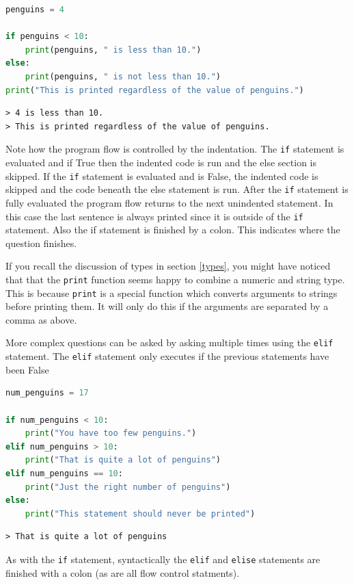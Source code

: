 		\begin{lstlisting}[language=Python]
penguins = 4

if penguins < 10:
	print(penguins, " is less than 10.")
else:
	print(penguins, " is not less than 10.")
print("This is printed regardless of the value of penguins.")\end{lstlisting}
		\begin{verbatim}
> 4 is less than 10.
> This is printed regardless of the value of penguins.\end{verbatim}	
		Note how the program flow is controlled by the indentation. The \texttt{if} statement  is evaluated and if True then the indented code is run and the else section is skipped. If the \texttt{if} statement  is evaluated and is False, the indented code is skipped and the code beneath the else statement is run. After the \texttt{if}  statement is fully evaluated the program flow returns to the next unindented statement. In this case the last sentence is always printed since it is outside of the \texttt{if} statement. Also the if statement is finished by a colon. This indicates where the question finishes.
		
		If you recall the discussion of types in section \ref{types}, you might have noticed that that the \texttt{print} function seems happy to combine a numeric and string type. This is because \texttt{print} is a special function which converts arguments to strings before printing them. It will only do this if the arguments are separated by a comma as above.
		
		More complex questions can be asked by asking multiple times using the \texttt{elif} statement. The \texttt{elif} statement only executes if the previous statements have been False
		\begin{lstlisting}[language=Python]
num_penguins = 17

if num_penguins < 10:
	print("You have too few penguins.")
elif num_penguins > 10:
	print("That is quite a lot of penguins")
elif num_penguins == 10:
	print("Just the right number of penguins")
else:
	print("This statement should never be printed")\end{lstlisting}
		\begin{verbatim}> That is quite a lot of penguins\end{verbatim}
As with the \texttt{if} statement, syntactically the \texttt{elif} and \texttt{elise} statements are finished with a colon (as are all flow control statments).	

